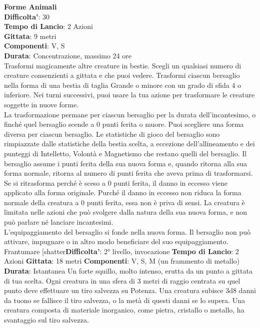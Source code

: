 \begin{multicols}{2}
\medskip\textbf{Forme Animali}\\
\textbf{Difficolta'}: 30\\
\textbf{Tempo di Lancio}: 2 Azioni\\
\textbf{Gittata}: 9 metri\\
\textbf{Componenti}: V, S\\
\textbf{Durata}: Concentrazione, massimo 24 ore\\
Trasformi magicamente altre creature in bestie. Scegli un qualsiasi numero di creature consenzienti a gittata e che puoi vedere. Trasformi ciascun bersaglio nella forma di una bestia di taglia Grande o minore con un grado di sfida 4 o inferiore. Nei turni successivi, puoi usare la tua azione per trasformare le creature soggette in nuove forme.\\
La trasformazione permane per ciascun bersaglio per la durata dell’incantesimo, o finché quel bersaglio scende a 0 punti ferita o muore. Puoi scegliere una forma diversa per ciascun bersaglio. Le  statistiche di gioco del bersaglio sono rimpiazzate dalle statistiche della bestia scelta, a eccezione dell’allineamento e dei punteggi di Intelletto, Volontà e Magnetismo che restano quelli del
bersaglio. Il bersaglio assume i punti ferita della sua nuova forma e, quando ritorna alla sua forma normale, ritorna al numero di punti ferita che aveva prima di trasformarsi. Se si ritrasforma perché è sceso a 0 punti ferita, il danno in eccesso viene applicato alla forma originale. Purché il danno in eccesso non riduca la forma normale della creatura a 0 punti ferita, essa non è priva di sensi. La creatura è limitata nelle azioni che può svolgere dalla natura della sua nuova forma, e non può parlare né lanciare incantesimi.\\
L’equipaggiamento del bersaglio si fonde nella nuova
forma. Il bersaglio non può attivare, impugnare o in altro
modo beneficiare del suo equipaggiamento.
Frantumare
[shatter\textbf{Difficolta'}:
2° livello, invocazione
\textbf{Tempo di Lancio}: 2 Azioni
\textbf{Gittata}: 18 metri
\textbf{Componenti}: V, S, M (un frammento di metallo)
\textbf{Durata}: Istantanea
Un forte squillo, molto intenso, erutta da un punto a
gittata di tua scelta. Ogni creatura in una sfera di 3
metri di raggio centrata su quel punto deve effettuare
un tiro salvezza su Potenza. Una creatura subisce
3d8 danni da tuono se fallisce il tiro salvezza, o la metà
di questi danni se lo supera. Una creatura composta di
materiale inorganico, come pietra, cristallo o metallo, ha
svantaggio sul tiro salvezza.

\end{multicols}
